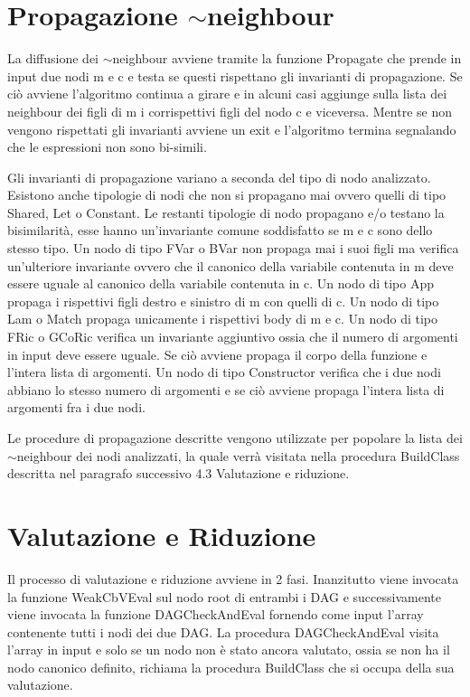 \documentclass[12pt,a4paper,openright,twoside]{report}
\begin{document}
\section{Propagazione $\sim$neighbour}
La diffusione dei $\sim$neighbour avviene tramite la funzione Propagate che prende in input due nodi m e c e testa se questi rispettano gli invarianti di propagazione. Se ci\`o avviene l'algoritmo continua a girare e in alcuni casi aggiunge sulla lista dei neighbour dei figli di m i corrispettivi figli del nodo c e viceversa. Mentre se non vengono rispettati gli invarianti avviene un exit e l'algoritmo termina segnalando che le espressioni non sono bi-simili.\newline

Gli invarianti di propagazione variano a seconda del tipo di nodo analizzato. Esistono anche tipologie di nodi che non si propagano mai ovvero quelli di tipo Shared, Let o Constant. Le restanti tipologie di nodo propagano e/o testano la bisimilarit\`a, esse hanno un'invariante comune soddisfatto se m e c sono dello stesso tipo.\newline
Un nodo di tipo FVar o BVar non propaga mai i suoi figli ma verifica un'ulteriore invariante ovvero che il canonico della variabile contenuta in m deve essere uguale al canonico della variabile contenuta in c.\newline
Un nodo di tipo App propaga i rispettivi figli destro e sinistro di m con quelli di c.\newline
Un nodo di tipo Lam o Match propaga unicamente i rispettivi body di m e c.\newline
Un nodo di tipo FRic o GCoRic verifica un invariante aggiuntivo ossia che il numero di argomenti in input deve essere uguale. Se ci\`o avviene propaga il corpo della funzione e l'intera lista di argomenti. \newline
Un nodo di tipo Constructor verifica che i due nodi abbiano lo stesso numero di argomenti e se ci\`o avviene propaga l'intera lista di argomenti fra i due nodi.\newline

Le procedure di propagazione descritte vengono utilizzate per popolare la lista dei $\sim$neighbour dei nodi analizzati, la quale verr\`a visitata nella procedura BuildClass descritta nel paragrafo successivo 4.3 Valutazione e riduzione. 

\section{Valutazione e Riduzione}
Il processo di valutazione e riduzione avviene in 2 fasi. Inanzitutto viene invocata la funzione WeakCbVEval sul nodo root di entrambi i DAG e successivamente viene invocata la funzione DAGCheckAndEval fornendo come input l'array contenente tutti i nodi dei due DAG.\newline
La procedura DAGCheckAndEval visita l'array in input e solo se un nodo non \`e stato ancora valutato, ossia se non ha il nodo canonico definito, richiama la procedura BuildClass che si occupa della sua valutazione.
\end{document}
